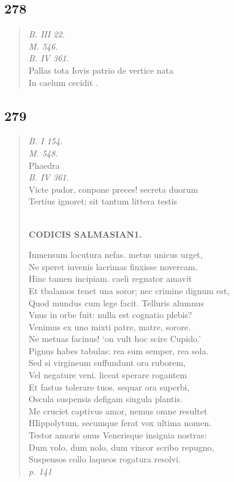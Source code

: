 \documentclass[11pt, a4paper]{report}
\begin{document}
            \subsection*{278}
      \begin{verse}
      \textit{B. III 22.} \\ \textit{M. 546.} \\ \textit{B. IV 361.} \\ Pallas tota Iovis patrio de vertice nata \\ In caelum cecidit . \\ 
      \end{verse}
  
            \subsection*{279}
      \begin{verse}
      \textit{B. I 154.} \\ \textit{M. 548.} \\ Phaedra \\ \textit{B. IV 361.} \\ Victe pudor, conpone preces! secreta duorum \\ Tertius ignoret; sit tantum littera testis \\ 
        ﻿\pagebreak 
    \begin{center} \textbf{CODICIS SALMASIAN1.} \end{center} \marginpar{[219]} Inmensum locutura nefas. metus unicus urget, \\ Ne speret iuvenis lacrimas finxisse novercam. \\ Hinc tamen incipiam. caeli regnator amavit \\ Et tbalamos tenet una soror; nec crimine dignum est, \\ Quod mundus cum lege facit. Telluris alumnus \\ Vnus in orbe fuit: nulla est cognatio plebis? \\ Venimus ex uno mixti patre, matre, sorore. \\ Ne metuas facinus! ‘on vult hoc scire Cupido.’ \\ Pignus habes tabulas: rea sum semper, rea sola. \\ Sed si virgineum suffundunt ora ruborem, \\ Vel negature veni. liceat sperare rogantem \\ Et fastus tolerare tuos. sequar ora superbi, \\ Oscula suspensis defigam singula plantis. \\ Me cruciet captivus amor, nemus omne resultet \\ HIippolytum, secumque ferat vox ultima nomen. \\ Testor amoris onus Venerisque insignia nostrae: \\ Dum volo, dum nolo, dum vincor scribo repugno, \\ Suspensos collo laqueos rogatura resolvi. \\ \textit{p. 141} \\ 
      \end{verse}
  
\end{document}
